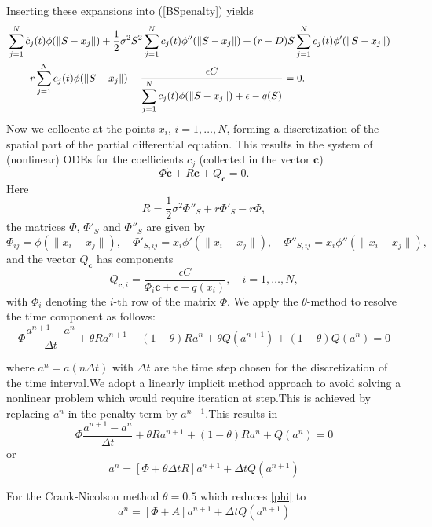 \documentclass[12pt]{article}
\numberwithin{equation}{section} %
\begin{document}
Inserting these expansions into (\ref{BSpenalty}) yields
\begin{eqnarray*}
& \displaystyle \sum_{j=1}^N \dot{c}_j(t) \phi(\|S-x_j\|) +
\frac{1}{2}\sigma^2 S^2 \sum_{j=1}^N c_j(t) \phi''(\|S-x_j\|) +
(r-D)S\sum_{j=1}^N c_j(t) \phi'(\|S-x_j\|)& \cr & \displaystyle
\quad  - r \sum_{j=1}^N c_j(t) \phi(\|S-x_j\|) +\frac{\epsilon
C}{\displaystyle \sum_{j=1}^N c_j(t) \phi(\|S-x_j\|) + \epsilon -
q(S)}= 0.&
\end{eqnarray*}
Now we collocate at the points $x_i$, $i=1,\ldots,N$, forming a
discretization of the spatial part of the partial differential
equation. This results in the system of (nonlinear) ODEs for the
coefficients $c_j$ (collected in the vector $\textbf{c}$)
\begin{equation}\label{ode}
\Phi \dot{\textbf{c}} + R \textbf{c} + Q_{\textbf{c}} = 0.
\end{equation}
Here
$$
R = \frac{1}{2} \sigma^2 \Phi''_S + r \Phi'_S - r \Phi,
$$
the matrices $\Phi$, $\Phi'_S$ and $\Phi''_S$ are given by
$$
\Phi_{ij} = \phi(\|x_i-x_j\|), \quad \Phi'_{S,ij} =
x_i\phi'(\|x_i-x_j\|), \quad \Phi''_{S,ij} = x_i\phi''(\|x_i-x_j\|),
$$
and the vector $Q_{\textbf{c}}$ has components
$$
Q_{\textbf{c},i} =\frac{\epsilon C}{\Phi_i \textbf{c} + \epsilon -
q(x_i)}, \quad i=1,\ldots,N,
$$
with $\Phi_i$ denoting the $i$-th row of the matrix $\Phi$.
    We apply the $\theta$-method to resolve the time component as
    follows:
    \begin{equation*}
    \Phi\frac{a^{n+1}-a^n}{\Delta t}+\theta Ra^{n+1}+(1-\theta)Ra^n
    +\theta Q(a^{n+1})+(1-\theta)Q(a^n)=0
\end{equation*}


where $a^n=a(n\Delta t)$ with $\Delta t$ are the time step chosen
for the discretization of the time interval.We adopt a linearly
implicit method approach to avoid solving a nonlinear problem which
would require iteration at step.This is achieved by replacing
$\textbf{$a^{n}$}$ in the penalty term by $\textbf{$a^{n+1}$}$.This
results in
 \begin{equation*}
    \Phi\frac{a^{n+1}-a^n}{\Delta t}+\theta Ra^{n+1}+(1-\theta)Ra^n
    + Q(a^n)=0
\end{equation*}
or
\begin{equation*}
   [\Phi-(1-\theta)\Delta tR]a^{n}=[\Phi + \theta\Delta tR]a^{n+1}+\Delta tQ(a^{n+1})
\end{equation*}

For the Crank-Nicolson method $\theta=0.5$ which reduces \ref{phi}
to
\begin{equation*}
   [\Phi-A]a^{n}=[\Phi + A]a^{n+1}+\Delta tQ(a^{n+1})
\end{equation*}
\end{document}
